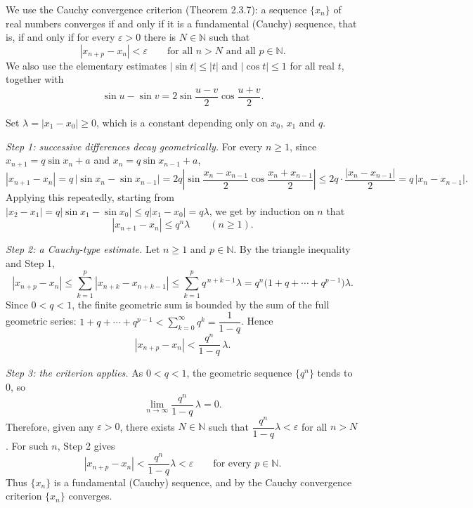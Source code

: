 \documentclass[11pt,a4paper]{article}
\newenvironment{solution}[1]{%
  \par\addvspace{1.7ex}%
  \noindent{\color{solutioncolor}\textbf{#1}}\hspace{0.55em}\ignorespaces}%
  {\par\addvspace{0.9ex}}
\begin{document}
\begin{solution}{Solution 2.3.8}\label{es:2.3.8}
We use the Cauchy convergence criterion (Theorem 2.3.7): a sequence $\{x_n\}$ of
real numbers converges if and only if it is a fundamental (Cauchy) sequence, that
is, if and only if for every $\varepsilon>0$ there is $N\in\mathbb{N}$ such that
\[
|x_{n+p}-x_n|<\varepsilon\qquad\text{for all }n>N\text{ and all }p\in\mathbb{N}.
\]
We also use the elementary estimates $|\sin t|\le|t|$ and $|\cos t|\le1$ for all
real $t$, together with
\[
\sin u-\sin v=2\sin\frac{u-v}{2}\cos\frac{u+v}{2}.
\]

Set $\lambda=|x_1-x_0|\ge0$, which is a constant depending only on $x_0$, $x_1$
and $q$.

\emph{Step 1: successive differences decay geometrically.} For every $n\ge1$,
since $x_{n+1}=q\sin x_n+a$ and $x_n=q\sin x_{n-1}+a$,
\[
|x_{n+1}-x_n|
=q\,|\sin x_n-\sin x_{n-1}|
=2q\left|\sin\frac{x_n-x_{n-1}}{2}\cos\frac{x_n+x_{n-1}}{2}\right|
\le 2q\cdot\frac{|x_n-x_{n-1}|}{2}
=q\,|x_n-x_{n-1}| .
\]
Applying this repeatedly, starting from $|x_2-x_1|=q|\sin x_1-\sin x_0|\le
q|x_1-x_0|=q\lambda$, we get by induction on $n$ that
\[
|x_{n+1}-x_n|\le q^n\lambda\qquad(n\ge1).
\]

\emph{Step 2: a Cauchy-type estimate.} Let $n\ge1$ and $p\in\mathbb{N}$. By the
triangle inequality and Step 1,
\[
|x_{n+p}-x_n|
\le\sum_{k=1}^{p}|x_{n+k}-x_{n+k-1}|
\le\sum_{k=1}^{p}q^{\,n+k-1}\lambda
=q^n\bigl(1+q+\cdots+q^{p-1}\bigr)\lambda .
\]
Since $0<q<1$, the finite geometric sum is bounded by the sum of the full
geometric series: $1+q+\cdots+q^{p-1}<\sum_{k=0}^{\infty}q^k=\dfrac{1}{1-q}$.
Hence
\[
|x_{n+p}-x_n|<\frac{q^n}{1-q}\,\lambda .
\]

\emph{Step 3: the criterion applies.} As $0<q<1$, the geometric sequence
$\{q^n\}$ tends to $0$, so
\[
\lim_{n\to\infty}\frac{q^n}{1-q}\,\lambda=0 .
\]
Therefore, given any $\varepsilon>0$, there exists $N\in\mathbb{N}$ such that
$\dfrac{q^n}{1-q}\lambda<\varepsilon$ for all $n>N$. For such $n$, Step 2 gives
\[
|x_{n+p}-x_n|<\frac{q^n}{1-q}\lambda<\varepsilon
\qquad\text{for every }p\in\mathbb{N}.
\]
Thus $\{x_n\}$ is a fundamental (Cauchy) sequence, and by the Cauchy convergence
criterion $\{x_n\}$ converges.
\end{solution}
\end{document}
